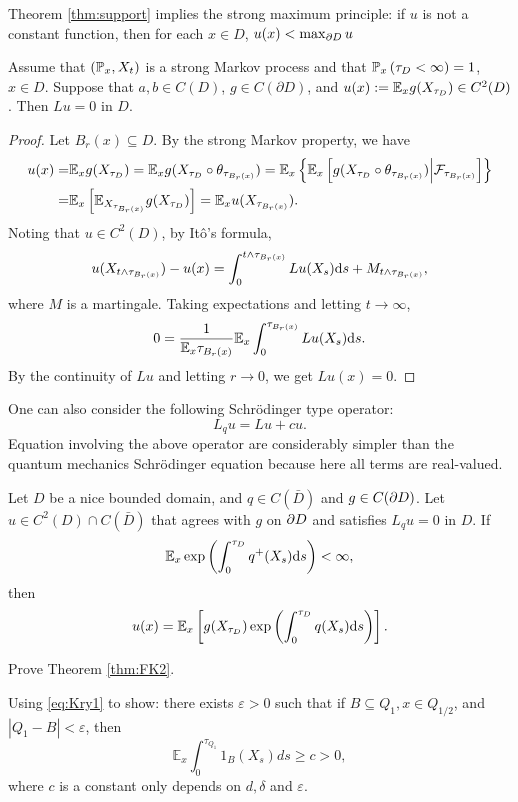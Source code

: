 	\begin{exercise}
		Theorem \ref{thm:support} implies the strong maximum principle: if $u$ is not a constant function, then for each  $x\in D$, $u(x)<\max_{\partial D} u$
	\end{exercise}
	
	\begin{theorem}
		Assume that \(({\mathbb P}_x, X_t)\) is a strong Markov process and that ${\mathbb P}_x\left( \tau_D<\infty\right)=1$, \(x\in D\). Suppose that \(a,b\in C(D)\), $g\in C(\partial D)$, and $u(x):={\mathbb E}_x g(X_{\tau_D})\in C^2(D)$. Then $L u=0$ in $D$.
	\end{theorem}
\begin{proof}
    Let $B_r(x)\subseteq D$. By the strong Markov property, we have 
        \begin{align*}
          u(x)=&{\mathbb E}_x g(X_{\tau_D})= {\mathbb E}_x g(X_{\tau_{D}}\circ \theta_{\tau_{B_r(x)}})={\mathbb E}_x \left\{ {\mathbb E}_x \left[ g(X_{\tau_{D}}\circ \theta_{\tau_{B_r(x)}})\Big|{\mathcal F}_{\tau_{B_r(x)}}\right] \right\}\\
          =&{\mathbb E}_x \left[ {\mathbb E}_{X_{\tau_{B_r(x)}}} g(X_{\tau_D})\right]= {\mathbb E}_x u(X_{\tau_{B_r(x)}}). 
        \end{align*}
     Noting that $u\in C^2(D)$, by It\^o's formula, 
     \[
         u(X_{t\wedge \tau_{B_r(x)}})-u(x) = \int_0^{t\wedge \tau_{B_r(x)}} L u (X_s) \text{\rm{d}} s+ M_{t\wedge \tau_{B_r(x)}}, 
     \]
     where $M$ is a martingale. Taking expectations and letting $t\to\infty$, 
     \[
        0= \frac{1}{{\mathbb E}_x\tau_{B_r(x)}}{\mathbb E}_x \int_0^{\tau_{B_r(x)}} L u(X_s) \text{\rm{d}} s.  
     \]
     By the continuity of $Lu$ and letting $r\to0$, we get $Lu(x)=0$. 
\end{proof}


    One can also consider the following Schrödinger type operator: 
    \[
      L_q u= Lu+cu. 
    \]
   Equation involving the above operator are considerably simpler than the quantum mechanics Schrödinger equation because here all terms are real-valued. 

   \begin{theorem}\label{thm:FK2}
       Let $D$ be a nice bounded domain, and $q\in C(\bar D)$ and $g\in C(\partial D)$. Let $u\in C^2(D)\cap C(\bar D)$ that agrees with $g$ on $\partial D$ and satisfies $L_q u=0$ in $D$. If 
       \[
          {\mathbb E}_x \exp\left(\int_0^{\tau_D}q^+(X_s) \text{\rm{d}} s\right)<\infty, 
       \]
       then 
       \[
         u(x)={\mathbb E}_x \left[ g(X_{\tau_D})\exp\left(\int_0^{\tau_D}q(X_s) \text{\rm{d}} s\right)\right].
       \]
   \end{theorem}
   
\begin{exercise}
    Prove Theorem \ref{thm:FK2}. 
\end{exercise}
\begin{exercise}
    Using \eqref{eq:Kry1} to show: there exists $\varepsilon>0$ such that if $B \subseteq Q_1, x \in Q_{1/2}$, and $|Q_1-B|<\varepsilon$, then
    $$
    \mathbb{E}_x \int_0^{\tau_{Q_1}} 1_B\left(X_s\right) d s \geq c>0, 
    $$
    where $c$ is a constant only depends on $d,\delta$ and $\varepsilon$. 
\end{exercise}
	

